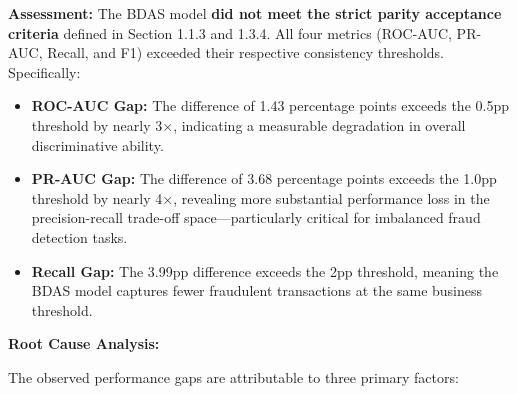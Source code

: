 \documentclass[sigplan,screen]{acmart}
\begin{document}
\textbf{Assessment:} The BDAS model \textbf{did not meet the strict parity acceptance criteria} defined in Section 1.1.3 and 1.3.4. All four metrics (ROC-AUC, PR-AUC, Recall, and F1) exceeded their respective consistency thresholds. Specifically:

\begin{itemize}
\item \textbf{ROC-AUC Gap:} The difference of 1.43 percentage points exceeds the 0.5pp threshold by nearly 3×, indicating a measurable degradation in overall discriminative ability.
\item \textbf{PR-AUC Gap:} The difference of 3.68 percentage points exceeds the 1.0pp threshold by nearly 4×, revealing more substantial performance loss in the precision-recall trade-off space—particularly critical for imbalanced fraud detection tasks.
\item \textbf{Recall Gap:} The 3.99pp difference exceeds the 2pp threshold, meaning the BDAS model captures fewer fraudulent transactions at the same business threshold.
\end{itemize}

\textbf{Root Cause Analysis:}

The observed performance gaps are attributable to three primary factors:
\end{document}
